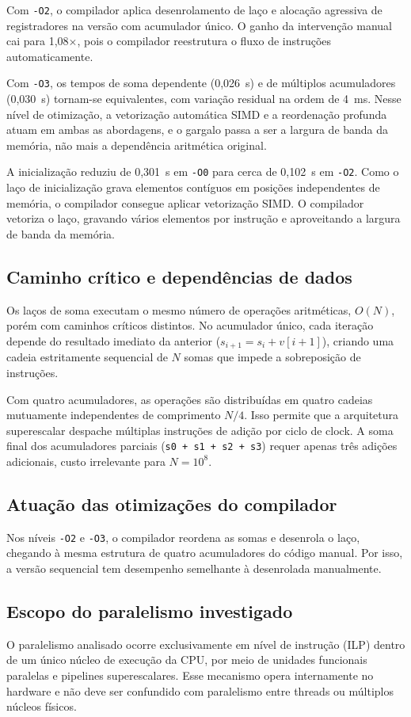 \documentclass[11pt,letterpaper]{article}
\begin{document}
Com \texttt{-O2}, o compilador aplica desenrolamento de laço e alocação agressiva
de registradores na versão com acumulador único. O ganho da intervenção manual
cai para 1,08$\times$, pois o compilador reestrutura o fluxo de instruções
automaticamente.

Com \texttt{-O3}, os tempos de soma dependente (0,026~s) e de múltiplos acumuladores
(0,030~s) tornam-se equivalentes, com variação residual na ordem de 4~ms.
Nesse nível de otimização, a vetorização automática SIMD e a reordenação profunda
atuam em ambas as abordagens, e o gargalo passa a ser a largura de banda da
memória, não mais a dependência aritmética original.

A inicialização reduziu de 0,301~s em \texttt{-O0} para cerca de 0,102~s em
\texttt{-O2}. Como o laço de inicialização grava elementos contíguos em posições
independentes de memória, o compilador consegue aplicar vetorização SIMD. O compilador vetoriza o laço, gravando vários elementos por
instrução e aproveitando a largura de banda da memória.

\subsection{Caminho crítico e dependências de dados}
Os laços de soma executam o mesmo número de operações aritméticas, $O(N)$, porém
com caminhos críticos distintos. No acumulador único, cada iteração depende do
resultado imediato da anterior ($s_{i+1} = s_i + v[i+1]$), criando uma cadeia
estritamente sequencial de $N$ somas que impede a sobreposição de instruções.

Com quatro acumuladores, as operações são distribuídas em quatro cadeias
mutuamente independentes de comprimento $N/4$. Isso permite que a arquitetura
superescalar despache múltiplas instruções de adição por ciclo de clock. A soma
final dos acumuladores parciais (\texttt{s0 + s1 + s2 + s3}) requer apenas
três adições adicionais, custo irrelevante para $N = 10^8$.

\subsection{Atuação das otimizações do compilador}
Nos níveis \texttt{-O2} e \texttt{-O3}, o compilador reordena as somas e
desenrola o laço, chegando à mesma estrutura de quatro acumuladores do código
manual. Por isso, a versão sequencial tem desempenho semelhante à desenrolada
manualmente.

\subsection{Escopo do paralelismo investigado}
O paralelismo analisado ocorre exclusivamente em nível de instrução (ILP) dentro
de um único núcleo de execução da CPU, por meio de unidades funcionais paralelas
e pipelines superescalares. Esse mecanismo opera internamente no hardware e não
deve ser confundido com paralelismo entre threads ou múltiplos núcleos físicos.
\end{document}
